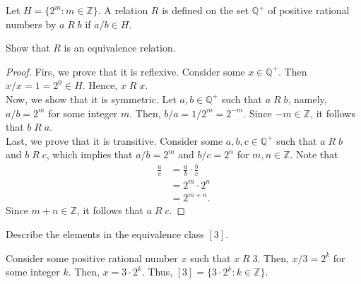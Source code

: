 \documentclass[12pt]{article}
\newcommand{\Z}{\mathbb{Z}}
\newcommand{\Q}{\mathbb{Q}}
\newenvironment{problem}[2][Problem]{\begin{trivlist}
		\item[\hskip \labelsep {\bfseries #1}\hskip \labelsep {\bfseries #2.}]}{\end{trivlist}}
\newenvironment{solution}[2][Solution]{\begin{trivlist}
		\item[\hskip \labelsep {\bfseries #1}\hskip \labelsep {\bfseries #2.}]}{\end{trivlist}}
\begin{document}
    \begin{problem}{30}
    	Let $H=\{2^{m}:m\in \Z\}$. A relation $R$ is defined on the set $\Q^{+}$ of positive rational numbers by $a\; R \; b$ if $a/b\in H$.
    	\begin{enumerate}[label=(\alph*)]
    		\item Show that $R$ is an equivalence relation.
    		\begin{proof}
    			Firs, we prove that it is reflexive. Consider some $x\in \Q^{+}$. Then $x/x = 1 = 2^{0} \in H$. Hence, $x\; R \; x$.\\
    			Now, we show that it is symmetric. Let $a,b\in \Q^{+}$ such that $a\; R \; b$, namely, $a/b = 2^{m}$ for some integer $m$. Then, $b/a = 1/2^{m} = 2^{-m}$. Since $-m\in \Z$, it follows that $b\; R \; a$.\\
    			Last, we prove that it is transitive. Consider some $a,b,c \in \Q^{+}$ such that $a \; R \; b$ and $b \; R \; c$, which implies that $a/b = 2^{m}$ and $b/c = 2^{n}$ for $m,n\in \Z$. Note that 
    			\begin{align*}
    				\frac{a}{c} &= \frac{a}{b}\cdot \frac{b}{c}\\
    				 &= 2^{m} \cdot 2^{n}\\
    				&= 2^{m+n}.
    			\end{align*}
    		Since $m+n \in \Z$, it follows that $a\; R \; c$.
    		\end{proof}
    		\item Describe the elements in the equivalence class $[3]$.
    		\begin{solution}{b}
    			Consider some positive rational number $x$ such that $x \; R \; 3$. Then, $x/3 = 2^{k}$ for some integer $k$. Then, $x=3 \cdot 2^{k}$. Thus, $[3] = \{3\cdot 2^{k}:k\in \Z\}$.
    		\end{solution}
    	\end{enumerate}
    \end{problem}
\end{document}
